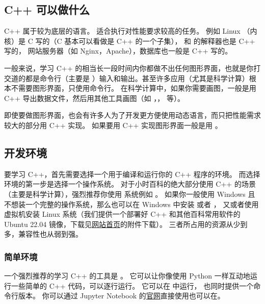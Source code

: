 

\begin{issues}
\issueDraft
\end{issues}

\subsection{C++ 可以做什么}
C++ 属于较为底层的语言。 适合执行对性能要求较高的任务。 例如 Linux （内核）是 C 写的（C 基本可以看做是 C++ 的一个子集），  和  的解释器也是 C++ 写的， 网站服务器（如 Nginx，Apache），数据库也一般是 C++ 写的。

一般来说，学习 C++ 的相当长一段时间内你都做不出任何图形界面，也就是你打交道的都是命令行（主要是 ）输入和输出。甚至许多应用（尤其是科学计算）根本不需要图形界面，只使用命令行。 在科学计算中，如果你需要画图，一般是用 C++ 导出数据文件，然后用其他工具画图（如 ，， 等）。

即使要做图形界面，也会有许多人为了开发更方便使用动态语言，而只把性能需求较大的部分用 C++ 实现。 如果要用 C++ 实现图形界面一般是用 。

\subsection{开发环境}
要学习 C++，首先需要选择一个用于编译和运行你的 C++ 程序的环境。 而选择环境的第一步是选择一个操作系统。 对于小时百科的绝大部分使用 C++ 的场景（主要是科学计算），强烈推荐你使用  系统例如 。 如果你一般使用 Windows 且不想装一个完整的操作系统，那么也可以在 Windows 中安装  或者 ， 又或者使用  虚拟机安装 Linux 系统（我们提供一个部署好 C++ 和其他百科常用软件的 Ubuntu 22.04 镜像，下载见\href{https://wuli.wiki}{网站首页}的附件下载）。 三者所占用的资源从少到多，兼容性也从弱到强。

\subsubsection{简单环境}
一个强烈推荐的学习 C++ 的工具是 。 它可以让你像使用 Python 一样互动地运行一些简单的 C++ 代码，可以逐行运行。 它可以在  中运行， 也同时提供一个命令行版本。 你可以通过 Jupyter Notebook 的\href{https://jupyter.org/}{官网}直接使用也可以在。

